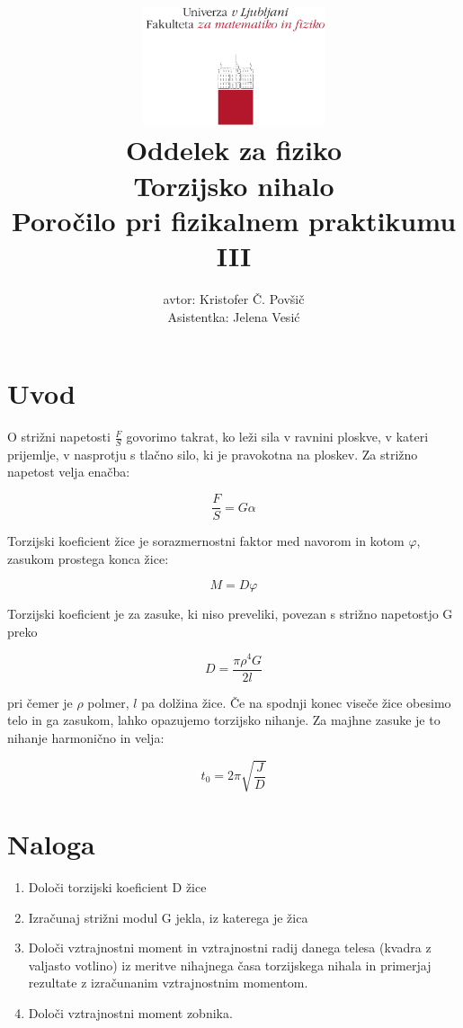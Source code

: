 \documentclass[12pt]{report}
\title{
  \includegraphics[width=0.4\textwidth]{fmf_logo}\\
  {\small Oddelek za fiziko} \\
  {Torzijsko nihalo}\\
  {\small Poročilo pri fizikalnem praktikumu III}\\

}
\date{}
\author{ avtor: Kristofer Č. Povšič \\[5 cm]
 \small  Asistentka: Jelena Vesić
}
\begin{document}
\setcounter{page}{2}

\maketitle

\chapter*{Uvod}

O strižni napetosti $\frac{F}{S}$ govorimo takrat, ko leži sila v ravnini ploskve, v kateri prijemlje, v nasprotju s tlačno silo, ki je pravokotna na ploskev. Za strižno napetost velja enačba:

\begin{equation}
  \frac{F}{S} = G \alpha
\end{equation}

Torzijski koeficient žice je sorazmernostni faktor med navorom in kotom $\varphi$, zasukom prostega konca žice: 

\begin{equation}
  M = D \varphi
\end{equation}

Torzijski koeficient je za zasuke, ki niso preveliki, povezan s strižno napetostjo G preko 

\begin{equation} \label{eq:2}
  D = \frac{\pi \rho^4G}{2l}
\end{equation}

pri čemer je $\rho$ polmer, $l$ pa dolžina žice. Če na spodnji konec viseče žice obesimo telo in ga zasukom, lahko opazujemo torzijsko nihanje. Za majhne zasuke je to nihanje harmonično in velja: 

\begin{equation} \label{eq:1}
  t_0= 2\pi \sqrt{\frac{J}{D}}
\end{equation}

\chapter*{Naloga}

\begin{enumerate}
  \item Določi torzijski koeficient D žice
  \item Izračunaj strižni modul G jekla, iz katerega je žica
  \item Določi vztrajnostni moment in vztrajnostni radij danega telesa (kvadra z valjasto votlino) iz meritve nihajnega časa torzijskega nihala in primerjaj rezultate z izračunanim vztrajnostnim momentom. 
  \item Določi vztrajnostni moment zobnika. 
\end{enumerate}
\end{document}

